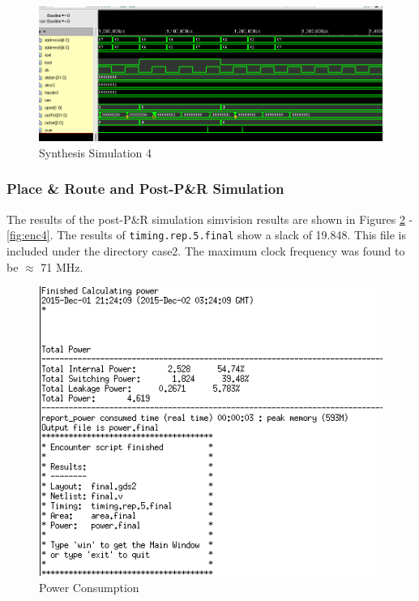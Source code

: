 \documentclass[12pt]{article}
\begin{document}
\begin{figure}[H]
\centering
\includegraphics[width=\linewidth]{../case2/synth4}
\caption{Synthesis Simulation 4}
\label{fig:synth4}
\end{figure}


\subsubsection{Place \& Route and Post-P\&R Simulation}
The results of the post-P\&R simulation simvision results are shown in Figures \ref{fig:power} - \ref{fig:enc4}. The results of \texttt{timing.rep.5.final} show a slack of 19.848. This file is included under the directory case2. The maximum clock frequency was found to be $\approx$ 71 MHz.
\begin{figure}[H]
\centering
\includegraphics[width=.7\linewidth]{../case2/power}
\caption{Power Consumption}
\label{fig:power}
\end{figure}
\end{document}
